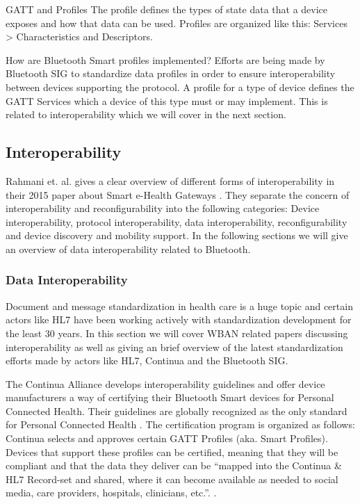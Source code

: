 GATT and Profiles
The profile defines the types of state data that a device exposes and how that data can be used. Profiles are organized like this: 
Services > Characteristics and Descriptors.

How are Bluetooth Smart profiles implemented? Efforts are being made by Bluetooth SIG to standardize data profiles in order to ensure interoperability between devices supporting the protocol. A profile for a type of device defines the GATT Services which a device of this type must or may implement. This is related to interoperability which we will cover in the next section.


\subsection{Interoperability} %
\label{sub:interoperability}

Rahmani et. al. gives a clear overview of different forms of interoperability in their 2015 paper about Smart e-Health Gateways \cite{DrAmirMohammadRahmani:2014vx}. They separate the concern of interoperability and reconfigurability into the following categories: Device interoperability, protocol interoperability, data interoperability, reconfigurability and device discovery and mobility support. In the following sections we will give an overview of data interoperability related to Bluetooth.

\subsubsection{Data Interoperability} %
\label{ssub:data_interoperability}


Document and message standardization in health care is a huge topic and certain actors like HL7 have been working actively with standardization development for the least 30 years. In this section we will cover WBAN related papers discussing interoperability as well as giving an brief overview of the latest standardization efforts made by actors like HL7, Continua and the Bluetooth SIG.

The Continua Alliance develops interoperability guidelines and offer device manufacturers a way of certifying their Bluetooth Smart devices for Personal Connected Health. Their guidelines are globally recognized as the only standard for Personal Connected Health \cite{newRef_27}. The certification program is organized as follows: Continua selects and approves certain GATT Profiles (aka. Smart Profiles). Devices that support these profiles can be certified, meaning that they will be compliant and that the data they deliver can be ``mapped into the Continua & HL7 Record-set and shared, where it can become available as needed to social media, care providers, hospitals, clinicians, etc.''. \cite{newRef_27}.

